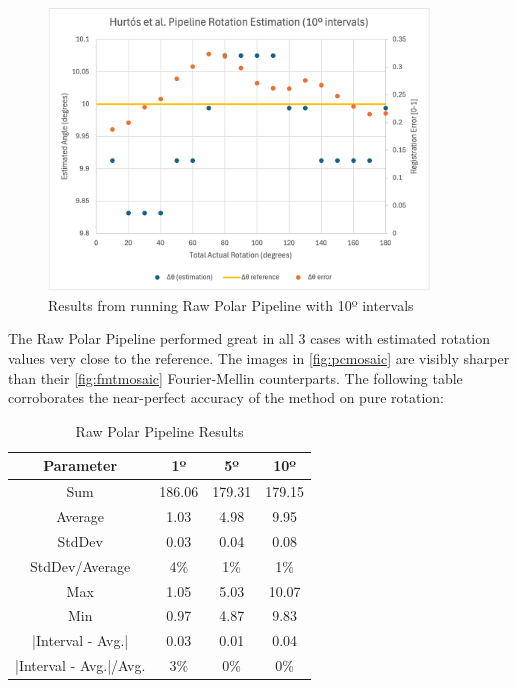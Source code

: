 \begin{figure}[H]
  \centering
  \includegraphics[width=0.9\textwidth]{figures/results/Rotation-Graphs/PC-10.png}
  \caption{Results from running Raw Polar Pipeline with 10º intervals}
\end{figure}

The Raw Polar Pipeline performed great in all 3 cases with estimated rotation values very close to the reference. The images in \autoref{fig:pcmosaic} are visibly sharper than their \autoref{fig:fmtmosaic} Fourier-Mellin counterparts. The following table corroborates the near-perfect accuracy of the method on pure rotation:

\begin{table}[H]
    \centering
    \begin{tabular}{|c|c|c|c|}
        \hline
        \textbf{Parameter} & \textbf{1º} & \textbf{5º} & \textbf{10º} \\ \hline
        Sum & 186.06 & 179.31 & 179.15 \\ \hline
        Average & 1.03 & 4.98 & 9.95 \\ \hline
        StdDev & 0.03 & 0.04 & 0.08 \\ \hline
        StdDev/Average & 4\% & 1\% & 1\% \\ \hline
        Max & 1.05 & 5.03 & 10.07 \\ \hline
        Min & 0.97 & 4.87 & 9.83 \\ \hline
        |Interval - Avg.| & 0.03 & 0.01 & 0.04 \\ \hline
        |Interval - Avg.|/Avg. & 3\% & 0\% & 0\% \\ \hline
    \end{tabular}
    \caption{Raw Polar Pipeline Results}
\end{table}

